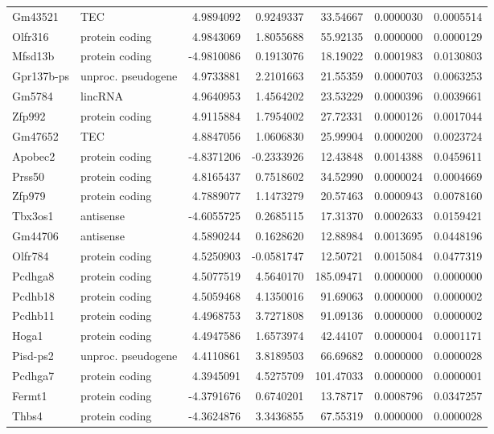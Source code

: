 \documentclass[onehalf,12pt]{beavtex}
\begin{document}
\begin{longtable}{llrrrrr}
  Gm43521 & TEC & 4.9894092 & 0.9249337 & 33.54667 & 0.0000030 & 0.0005514\\
  \addlinespace
  Olfr316 & protein coding & 4.9843069 & 1.8055688 & 55.92135 & 0.0000000 & 0.0000129\\
  Mfsd13b & protein coding & -4.9810086 & 0.1913076 & 18.19022 & 0.0001983 & 0.0130803\\
  Gpr137b-ps & unproc. pseudogene & 4.9733881 & 2.2101663 & 21.55359 & 0.0000703 & 0.0063253\\
  Gm5784 & lincRNA & 4.9640953 & 1.4564202 & 23.53229 & 0.0000396 & 0.0039661\\
  Zfp992 & protein coding & 4.9115884 & 1.7954002 & 27.72331 & 0.0000126 & 0.0017044\\
  \addlinespace
  Gm47652 & TEC & 4.8847056 & 1.0606830 & 25.99904 & 0.0000200 & 0.0023724\\
  Apobec2 & protein coding & -4.8371206 & -0.2333926 & 12.43848 & 0.0014388 & 0.0459611\\
  Prss50 & protein coding & 4.8165437 & 0.7518602 & 34.52990 & 0.0000024 & 0.0004669\\
  Zfp979 & protein coding & 4.7889077 & 1.1473279 & 20.57463 & 0.0000943 & 0.0078160\\
  Tbx3os1 & antisense & -4.6055725 & 0.2685115 & 17.31370 & 0.0002633 & 0.0159421\\
  \addlinespace
  Gm44706 & antisense & 4.5890244 & 0.1628620 & 12.88984 & 0.0013695 & 0.0448196\\
  Olfr784 & protein coding & 4.5250903 & -0.0581747 & 12.50721 & 0.0015084 & 0.0477319\\
  Pcdhga8 & protein coding & 4.5077519 & 4.5640170 & 185.09471 & 0.0000000 & 0.0000000\\
  Pcdhb18 & protein coding & 4.5059468 & 4.1350016 & 91.69063 & 0.0000000 & 0.0000002\\
  Pcdhb11 & protein coding & 4.4968753 & 3.7271808 & 91.09136 & 0.0000000 & 0.0000002\\
  \addlinespace
  Hoga1 & protein coding & 4.4947586 & 1.6573974 & 42.44107 & 0.0000004 & 0.0001171\\
  Pisd-ps2 & unproc. pseudogene & 4.4110861 & 3.8189503 & 66.69682 & 0.0000000 & 0.0000028\\
  Pcdhga7 & protein coding & 4.3945091 & 4.5275709 & 101.47033 & 0.0000000 & 0.0000001\\
  Fermt1 & protein coding & -4.3791676 & 0.6740201 & 13.78717 & 0.0008796 & 0.0347257\\
  Thbs4 & protein coding & -4.3624876 & 3.3436855 & 67.55319 & 0.0000000 & 0.0000028\\

\end{longtable}
\end{document}
